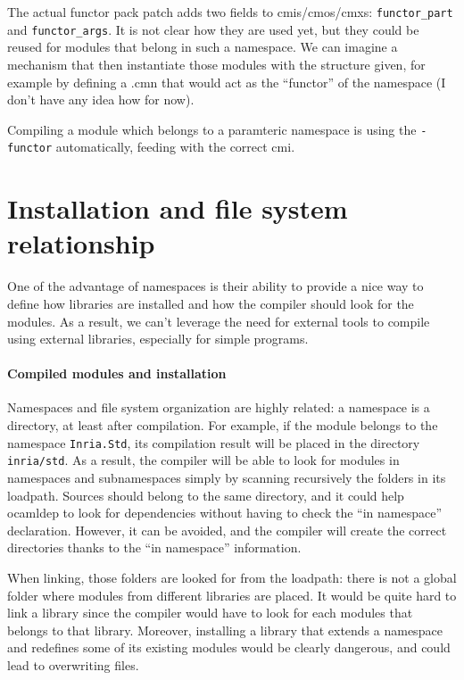 \documentclass[11pt,a4paper]{article}
\begin{document}
The actual functor pack patch adds two fields to cmis/cmos/cmxs:
\lstinline{functor_part} and \lstinline{functor_args}. It is not clear how they
are used yet, but they could be reused for modules that belong in such a
namespace. We can imagine a mechanism that then instantiate those modules with
the structure given, for example by defining a .cmn that would act as the
``functor'' of the namespace (I don't have any idea how for now).

Compiling a module which belongs to a paramteric namespace is using the
\lstinline{-functor} automatically, feeding with the correct cmi. 

\section{Installation and file system relationship}

One of the advantage of namespaces is their ability to provide a nice way to
define how libraries are installed and how the compiler should look for the
modules. As a result, we can't leverage the need for external tools to compile
using external libraries, especially for simple programs.

\paragraph{Compiled modules and installation}

Namespaces and file system organization are highly related: a namespace is a
directory, at least after compilation. For example, if the module belongs to the
namespace \texttt{Inria.Std}, its compilation result will be placed in the
directory \texttt{inria/std}. As a result, the compiler will be able to look for
modules in namespaces and subnamespaces simply by scanning recursively the
folders in its loadpath. Sources should belong to the same directory, and it
could help ocamldep to look for dependencies without having to check the ``in
namespace'' declaration. However, it can be avoided, and the compiler will
create the correct directories thanks to the ``in namespace'' information.

When linking, those folders are looked for from the loadpath: there is not a
global folder where modules from different libraries are placed. It would be
quite hard to link a library since the compiler would have to look for each
modules that belongs to that library. Moreover, installing a library that
extends a namespace and redefines some of its existing modules would be clearly
dangerous, and could lead to overwriting files.
\end{document}
